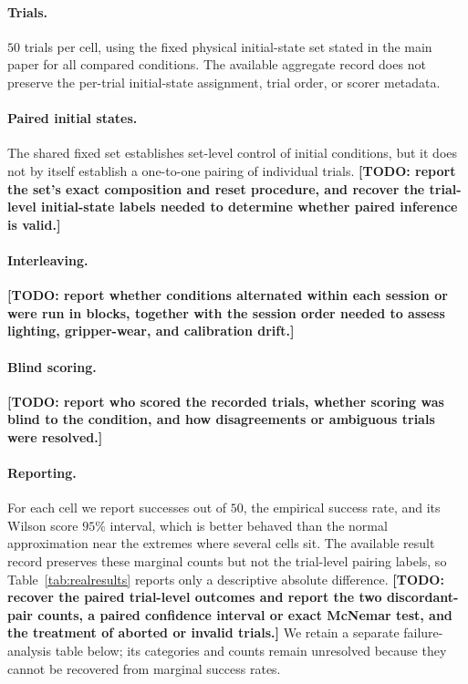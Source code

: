 \documentclass[letterpaper]{article} %
\newcommand{\todo}[1]{\textbf{[TODO: #1]}}
\begin{document}
\paragraph{Trials.}
$50$ trials per cell, using the fixed physical initial-state set stated in the
main paper for all compared conditions. The available aggregate record does not
preserve the per-trial initial-state assignment, trial order, or scorer metadata.

\paragraph{Paired initial states.}
The shared fixed set establishes set-level control of initial conditions, but it
does not by itself establish a one-to-one pairing of individual trials.
\todo{report the set's exact composition and reset procedure, and recover the
trial-level initial-state labels needed to determine whether paired inference is
valid.}

\paragraph{Interleaving.}
\todo{report whether conditions alternated within each session or were run in
blocks, together with the session order needed to assess lighting, gripper-wear,
and calibration drift.}

\paragraph{Blind scoring.}
\todo{report who scored the recorded trials, whether scoring was blind to the
condition, and how disagreements or ambiguous trials were resolved.}

\paragraph{Reporting.}
For each cell we report successes out of $50$, the empirical success rate, and
its Wilson score $95\%$ interval, which is better behaved than the normal
approximation near the extremes where several cells sit. The available result
record preserves these marginal counts but not the trial-level pairing labels,
so Table~\ref{tab:realresults} reports only a descriptive absolute difference.
\todo{recover the paired trial-level outcomes and report the two discordant-pair
counts, a paired confidence interval or exact McNemar test, and the treatment of
aborted or invalid trials.} We retain a separate failure-analysis table below;
its categories and counts remain unresolved because they cannot be recovered
from marginal success rates.
\end{document}
